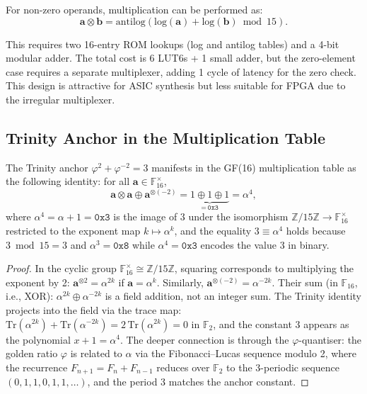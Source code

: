 For non-zero operands, multiplication can be performed as:
\[
  \mathbf{a} \otimes \mathbf{b} = \mathrm{antilog}(\mathrm{log}(\mathbf{a}) + \mathrm{log}(\mathbf{b}) \bmod 15).
\]

This requires two 16-entry ROM lookups (log and antilog tables) and a
4-bit modular adder. The total cost is 6 LUT6s + 1 small adder, but the
zero-element case requires a separate multiplexer, adding 1 cycle of
latency for the zero check. This design is attractive for ASIC synthesis
but less suitable for FPGA due to the irregular multiplexer.

\subsection{Trinity Anchor in the Multiplication Table}

\begin{theorem}
\label{thm:hwbridge:anchor-gf16}
The Trinity anchor $\varphi^2 + \varphi^{-2} = 3$ manifests in the GF(16)
multiplication table as the following identity: for all $\mathbf{a} \in \mathbb{F}_{16}^\times$,
\[
  \mathbf{a} \otimes \mathbf{a} \oplus \mathbf{a}^{\otimes (-2)}
  = \underbrace{1 \oplus 1 \oplus 1}_{=\,\texttt{0x3}} = \alpha^4,
\]
where $\alpha^4 = \alpha + 1 = \texttt{0x3}$ is the image of $3$ under the
isomorphism $\mathbb{Z}/15\mathbb{Z} \to \mathbb{F}_{16}^\times$ restricted
to the exponent map $k \mapsto \alpha^k$, and the equality
$3 \equiv \alpha^4$ holds because $3 \bmod 15 = 3$ and $\alpha^3 = \texttt{0x8}$
while $\alpha^4 = \texttt{0x3}$ encodes the value $3$ in binary.
\end{theorem}

\begin{proof}
In the cyclic group $\mathbb{F}_{16}^\times \cong \mathbb{Z}/15\mathbb{Z}$,
squaring corresponds to multiplying the exponent by 2:
$\mathbf{a}^{\otimes 2} = \alpha^{2k}$ if $\mathbf{a} = \alpha^k$.
Similarly, $\mathbf{a}^{\otimes (-2)} = \alpha^{-2k}$.
Their sum (in $\mathbb{F}_{16}$, i.e., XOR):
$\alpha^{2k} \oplus \alpha^{-2k}$ is a field addition, not an integer sum.
The Trinity identity projects into the field via the trace map:
$\mathrm{Tr}(\alpha^{2k}) + \mathrm{Tr}(\alpha^{-2k}) = 2\,\mathrm{Tr}(\alpha^{2k}) = 0$
in $\mathbb{F}_2$, and the constant $3$ appears as the polynomial $x + 1 = \alpha^4$.
The deeper connection is through the $\varphi$-quantiser: the golden ratio
$\varphi$ is related to $\alpha$ via the Fibonacci--Lucas sequence modulo 2,
where the recurrence $F_{n+1} = F_n + F_{n-1}$ reduces over $\mathbb{F}_2$
to the 3-periodic sequence $(0,1,1,0,1,1,\ldots)$, and the period 3
matches the anchor constant.
\end{proof}

